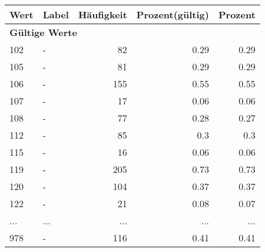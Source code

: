      \begin{longtable}{lXrrr}
     \toprule
     \textbf{Wert} & \textbf{Label} & \textbf{Häufigkeit} & \textbf{Prozent(gültig)} & \textbf{Prozent} \\
     \endhead
     \midrule
     \multicolumn{5}{l}{\textbf{Gültige Werte}}\\
        102 & \multicolumn{1}{X}{-} & %
          \num{82} &
          \num[round-mode=places,round-precision=2]{0.29} &
          \num[round-mode=places,round-precision=2]{0.29} \\
        105 & \multicolumn{1}{X}{-} & %
          \num{81} &
          \num[round-mode=places,round-precision=2]{0.29} &
          \num[round-mode=places,round-precision=2]{0.29} \\
        106 & \multicolumn{1}{X}{-} & %
          \num{155} &
          \num[round-mode=places,round-precision=2]{0.55} &
          \num[round-mode=places,round-precision=2]{0.55} \\
        107 & \multicolumn{1}{X}{-} & %
          \num{17} &
          \num[round-mode=places,round-precision=2]{0.06} &
          \num[round-mode=places,round-precision=2]{0.06} \\
        108 & \multicolumn{1}{X}{-} & %
          \num{77} &
          \num[round-mode=places,round-precision=2]{0.28} &
          \num[round-mode=places,round-precision=2]{0.27} \\
        112 & \multicolumn{1}{X}{-} & %
          \num{85} &
          \num[round-mode=places,round-precision=2]{0.3} &
          \num[round-mode=places,round-precision=2]{0.3} \\
        115 & \multicolumn{1}{X}{-} & %
          \num{16} &
          \num[round-mode=places,round-precision=2]{0.06} &
          \num[round-mode=places,round-precision=2]{0.06} \\
        119 & \multicolumn{1}{X}{-} & %
          \num{205} &
          \num[round-mode=places,round-precision=2]{0.73} &
          \num[round-mode=places,round-precision=2]{0.73} \\
        120 & \multicolumn{1}{X}{-} & %
          \num{104} &
          \num[round-mode=places,round-precision=2]{0.37} &
          \num[round-mode=places,round-precision=2]{0.37} \\
        122 & \multicolumn{1}{X}{-} & %
          \num{21} &
          \num[round-mode=places,round-precision=2]{0.08} &
          \num[round-mode=places,round-precision=2]{0.07} \\
       ... & ... & ... & ... & ... \\
        978 & \multicolumn{1}{X}{-} & %
          \num{116} &
          \num[round-mode=places,round-precision=2]{0.41} &
          \num[round-mode=places,round-precision=2]{0.41} \\


\end{longtable}
